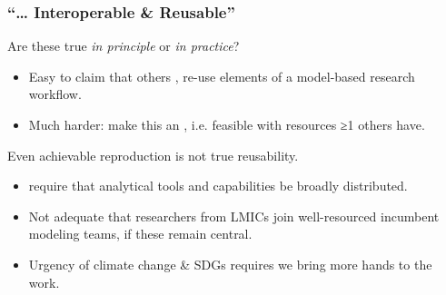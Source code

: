 \documentclass[12pt,aspectratio=169]{beamer}
\begin{document}
\begin{frame}
\frametitle{“… Interoperable \& Reusable”}

Are these true \emph{in principle} or \emph{in practice}?
\begin{itemize}
  \item Easy to claim that others , re-use elements of a model-based research workflow.
  \item Much harder: make this an , i.e. feasible with resources ≥1 others have.
\end{itemize}

\medskip
Even achievable reproduction is not true reusability.
\begin{itemize}
  \item {} require that analytical tools and capabilities be broadly distributed.
  \item Not adequate that researchers from LMICs join well-resourced incumbent modeling teams, if these remain central.
  \item Urgency of climate change \& SDGs requires we bring more hands to the work.
\end{itemize}

\end{frame}

\end{document}
